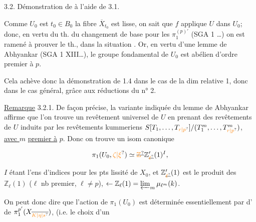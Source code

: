 
3.2. Démonstration de  à l'aide de 3.1.

Comme $U_0$ est  $t_0\in B_0$  la fibre $\overline X_{t_0}$ est lisse, on sait que $f$ applique $U$ dans $U_0$; donc,   en vertu du th. du changement de base pour les $\pi_1^{(p)'}$ (SGA 1 \ldots) on est ramené à prouver le th.,  dans la situation . Or, en vertu d'une  lemme de Abhyankar (SGA 1 XIII\ldots), le groupe fondamental de $U_0$ est  abélien d'ordre premier à $p$.

Cela achève donc la démonstration de 1.4 dans le cas  de la dim relative 1,  donc dans le cas général, grâce aux réductions du n° 2.

\uline{Remarque} 3.2.1. De façon précise, la variante indiquée du lemme de Abhyankar affirme que l'on trouve un revêtement universel de $U$ en prenant  des revêtements de $U$ induits par les revêtements kummeriens $S[T_1,\ldots,T_{\unsure{r|p}}]/(T_1^m,\ldots,T_{\unsure{r|p}}^m)$, \uline{avec $m$} \uline{premier à} $p$. Donc on trouve un isom canonique

\[
\pi_1(U_0,\unsure{\zeta|\xi})\simeq \deleted{\unsure{\mathbb Z}}\mathbb Z'_{\deleted{\unsure{\ell}}}(1)^I,
\]

$I$ étant l'ens d'indices pour  les pts  lissité de $X_0$, et $\mathbb Z'_{\deleted{\unsure{\ell}}}(1)$ est le produit des $\mathbb Z_\ell(1)$ ($\ell$ nb premier,  $\ell\ne p$), $\leftarrow\mathbb Z_\ell(1)=\varprojlim_m\mu_{\ell^m}(k)$.

On peut donc dire que l'action de $\pi_1(U_0)$ est déterminée essentiellement par   d'  de $\pi_1^{p'}(X_{\overline{\unsure{K|\eta|s}}})$,  (i.e. le choix d'un

